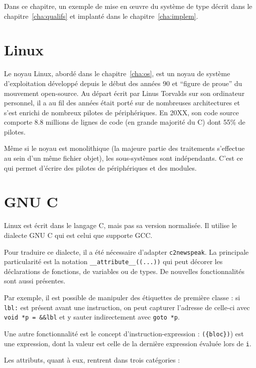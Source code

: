 Dans ce chapitre, un exemple de mise en œuvre du système de type décrit dans le
chapitre~\ref{cha:qualifs} et implanté dans le chapitre~\ref{cha:implem}.

\section{Linux}

Le noyau Linux, abordé dans le chapitre~\ref{cha:os}, est un noyau de système
d'exploitation développé depuis le début des années 90 et ``figure de proue'' du
mouvement open-source. Au départ écrit par Linus Torvalds sur son ordinateur
personnel, il a au fil des années était porté sur de nombreuses architectures et
s'est enrichi de nombreux pilotes de périphériques. En 20XX, son code source
comporte 8.8 millions de lignes de code (en grande majorité du C) dont 55\% de
pilotes.


Même si le noyau est monolithique (la majeure partie des traitements s'effectue
au sein d'un même fichier objet), les sous-systèmes sont indépendants. C'est ce
qui permet d'écrire des pilotes de périphériques et des modules.

\section{GNU C}

Linux est écrit dans le langage C, mais pas sa version normalisée. Il utilise le
dialecte GNU C qui est celui que supporte GCC.

Pour traduire ce dialecte, il a été nécessaire d'adapter \texttt{c2newspeak}. La
principale particularité est la notation \texttt{\_\_attribute\_\_((...))} qui
peut décorer les déclarations de fonctions, de variables ou de types. De
nouvelles fonctionnalités sont aussi présentes.

Par exemple, il est possible de manipuler des étiquettes de première classe : si
\texttt{lbl:} est présent avant une instruction, on peut capturer l'adresse de
celle-ci avec \texttt{void *p = \&\&lbl} et y sauter indirectement avec
\texttt{goto *p}.

Une autre fonctionnalité est le concept d'instruction-expression :
\texttt{(\{bloc\})}) est une expression, dont la valeur est celle de la dernière
expression évaluée lors de \texttt{i}.

Les attributs, quant à eux, rentrent dans trois catégories :

